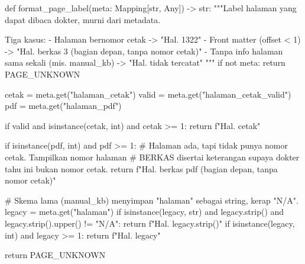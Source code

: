 def format_page_label(meta: Mapping[str, Any]) -> str:
    """Label halaman yang dapat dibaca dokter, murni dari metadata.

    Tiga kasus:
    - Halaman bernomor cetak      -> "Hal. 1322"
    - Front matter (offset < 1)   -> "Hal. berkas 3 (bagian depan, tanpa nomor cetak)"
    - Tanpa info halaman sama sekali (mis. manual_kb) -> "Hal. tidak tercatat"
    """
    if not meta:
        return PAGE_UNKNOWN

    cetak = meta.get("halaman_cetak")
    valid = meta.get("halaman_cetak_valid")
    pdf = meta.get("halaman_pdf")

    if valid and isinstance(cetak, int) and cetak >= 1:
        return f"Hal. {cetak}"

    if isinstance(pdf, int) and pdf >= 1:
        # Halaman ada, tapi tidak punya nomor cetak. Tampilkan nomor halaman
        # BERKAS disertai keterangan supaya dokter tahu ini bukan nomor cetak.
        return f"Hal. berkas {pdf} (bagian depan, tanpa nomor cetak)"

    # Skema lama (manual_kb) menyimpan "halaman" sebagai string, kerap "N/A".
    legacy = meta.get("halaman")
    if isinstance(legacy, str) and legacy.strip() and legacy.strip().upper() != "N/A":
        return f"Hal. {legacy.strip()}"
    if isinstance(legacy, int) and legacy >= 1:
        return f"Hal. {legacy}"

    return PAGE_UNKNOWN

